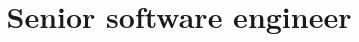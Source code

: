 \documentclass[10pt,a4paper,sans]{moderncv}
\title{Senior software engineer}
\begin{document}
    \makecvtitle

    
    
    

    \clearpage
\end{document}
